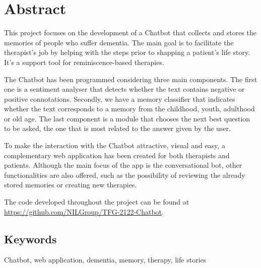 \chapter*{Abstract}

This project focuses on the development of a Chatbot that collects and stores the memories of people who suffer dementia. The main goal is to facilitate the therapist's job by helping with the steps prior to shapping a patient's life story. It's a support tool for reminiscence-based therapies.

The Chatbot has been programmed considering three main components. The first one is a sentiment analyser that detects whether the text contains negative or positive connotations. Secondly, we have a memory classifier that indicates whether the text corresponds to a memory from the childhood, youth, adulthood or old age. The last component is a module that chooses the next best question to be asked, the one that is most related to the answer given by the user.

To make the interaction with the Chatbot attractive, visual and easy, a complementary web application has been created for both therapists and patients. Although the main focus of the app is the conversational bot, other functionalities are also offered, such as the possibility of reviewing the already stored memories or creating new therapies.

The code developed throughout the project can be found at \url{https://github.com/NILGroup/TFG-2122-Chatbot}.


\section*{Keywords}

\noindent Chatbot, web application, dementia, memory, therapy, life stories



